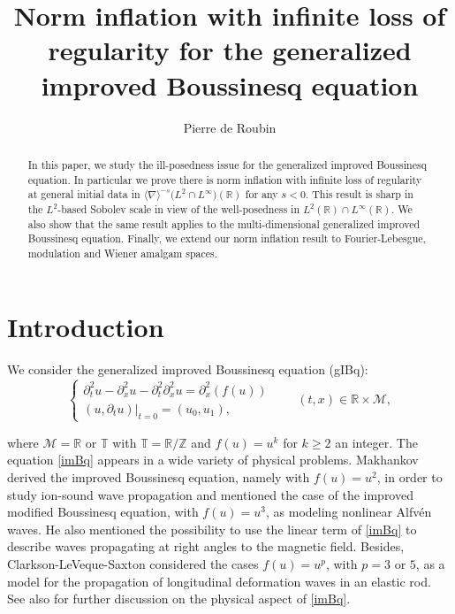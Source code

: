 \documentclass[letterpaper, 11pt,  reqno]{amsart}
\newcommand{\1}{\hspace{0.5mm}\text{I}\hspace{0.5mm}}
\newcommand{\noi}{\noindent}
\newcommand{\Z}{\mathbb{Z}}
\newcommand{\R}{\mathbb{R}}
\newcommand{\T}{\mathbb{T}}
\newcommand{\M}{\mathcal{M}}
\newcommand{\nb}{\nabla}
\newcommand{\dx}{\partial_x}
\newcommand{\dt}{\partial_t}
\newcommand{\jb}[1]
{\langle #1 \rangle}
\numberwithin{equation}{section}
\numberwithin{theorem}{section}
\begin{document}
\title[Norm inflation with infinite loss of regularity for gIBQ]{Norm inflation with infinite loss of regularity for the generalized improved Boussinesq equation}

\author{Pierre de Roubin}

\maketitle

\begin{abstract}
In this paper, we study the ill-posedness issue for the generalized improved Boussinesq equation. In particular we prove there is norm inflation with infinite loss of regularity at general initial data in $\jb{\nb}^{-s}\big(L^2 \cap L^\infty\big)(\R)$ for any $s < 0$. This result is sharp in the $L^2$-based Sobolev scale in view of the well-posedness in $L^2(\R) \cap L^\infty(\R)$. We also show that the same result applies to the multi-dimensional generalized improved Boussinesq equation. Finally, we extend our norm inflation result to Fourier-Lebesgue, modulation and Wiener amalgam spaces.
\end{abstract}

\section{Introduction}

We consider the generalized improved Boussinesq equation (gIBq):
\begin{equation}
\begin{cases}\label{imBq}
\dt^{2}u-\dx^2 u - \dt^2 \dx^2u = \dx^2 \left(f(u) \right) \\
(u,\dt u)|_{t = 0} = (u_0,u_1), 
\end{cases}
\qquad ( t, x) \in \R \times \M, 
\end{equation}

\noi where $\M =  \R$ or $\T$ with $\T = \R / \Z$ and $f(u) = u^k$ for $k \geq 2$ an integer. The equation \eqref{imBq} appears in a wide variety of physical problems. Makhankov~\cite{Mak} derived the improved Boussinesq equation, namely with $f(u) = u^2$, in order to study ion-sound wave propagation and mentioned the case of the improved modified Boussinesq equation, with $f(u) = u^3$, as modeling nonlinear Alfv\'en waves. He also mentioned the possibility to use the linear term of \eqref{imBq} to describe waves propagating at right angles to the magnetic field. Besides, Clarkson-LeVeque-Saxton \cite{CLS} considered the cases $f(u) = u^p$, with $p = 3$ or $5$, as a model for the propagation of longitudinal deformation waves in an elastic rod. See also \cite{Tur} for further discussion on the physical aspect of \eqref{imBq}.
\end{document}
